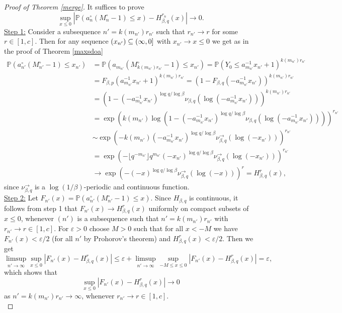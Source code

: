 \documentclass[12pt]{amsart}
\theoremstyle{definition}
\theoremstyle{remark}
\newcommand{\eps}{{\varepsilon}}
\newcommand{\Pm}{{\mathbb P}}
\numberwithin{equation}{section}
\begin{document}
\begin{proof}[Proof of Theorem \ref{merge}]
It suffices to prove
\begin{equation}\label{mergesuff}
\sup_{x\leq0}\left|\Pm\left(a_{n}^{\circ}(M_{n}^{\circ}-1)\leq x\right)-H^{r_{n}}_{\beta,q}(x)\right|\to0.
\end{equation}
\underline{Step 1:} Consider a subsequence $n'=k(m_{n'})r_{n'}$ such that $r_{n'}\to r$ for some $r\in[1,c]$. Then for any sequence $(x_{n'})\subseteq(\-\infty,0]$ with $x_{n'}\to x\leq0$ we get as in the proof of Theorem \ref{maxsdoa}
\begin{align*}
\Pm\left(a_{n'}^{\circ}(M_{n'}^{\circ}-1)\leq x_{n'}\right) & =\Pm\left(a_{m_{n'}}(M_{k(m_{n'})r_{n'}}^{\circ}-1)\leq x_{n'}\right) =\Pm(Y_{0}\leq a_{m_{n'}}^{-1}x_{n'}+1)^{k(m_{n'})r_{n'}}\\
& =F_{\beta,p}(a_{m_{n'}}^{-1}x_{n'}+1)^{k(m_{n'})r_{n'}}=\left(1-F_{\beta,q}(-a_{m_{n'}}^{-1}x_{n'})\right)^{k(m_{n'})r_{n'}}\\
& =\left(1-(-a_{m_{n'}}^{-1}x_{n'})^{\log q/\log\beta}\nu_{\beta,q}(\log(-a_{m_{n'}}^{-1}x_{n'}))\right)^{k(m_{n'})r_{n'}}\\
& =\exp\left(k(m_{n'})\log\left(1-(-a_{m_{n'}}^{-1}x_{n'})^{\log q/\log\beta}\nu_{\beta,q}(\log(-a_{m_{n'}}^{-1}x_{n'}))\right)\right)^{r_{n'}}\\
& \sim\exp\left(-k(m_{n'})(-a_{m_{n'}}^{-1}x_{n'})^{\log q/\log\beta}\nu_{\beta,q}^{\to}(\log(-x_{n'}))\right)^{r_{n'}}\\
& =\exp\left(-\lfloor q^{-m_{n'}}\rfloor q^{m_{n'}}(-x_{n'})^{\log q/\log\beta}\nu_{\beta,q}^{\to}(\log(-x_{n'}))\right)^{r_{n'}}\\
& \to\exp\left(-(-x)^{\log q/\log\beta}\nu_{\beta,q}^{\to}(\log(-x))\right)^{r}=H_{\beta,q}^{r}(x),
\end{align*}
since $\nu_{\beta,q}^{\to}$ is a $\log(1/\beta)$-periodic and continuous function.\\[1ex]

\underline{Step 2:} Let $F_{n'}(x)=\Pm\left(a_{n'}^{\circ}(M_{n'}^{\circ}-1)\leq x\right)$. Since $H_{\beta,q}$ is continuous, it follows from step 1 that $F_{n'}(x)\to H_{\beta,q}^{r}(x)$ uniformly on compact subsets of $x\leq0$, whenever $(n')$ is a subsequence such that $n'=k(m_{n'})r_{n'}$ with $r_{n'}\to r\in[1,c]$. For $\eps>0$ choose $M>0$ such that for all $x<-M$ we have $F_{n'}(x)<\eps/2$ (for all $n'$ by Prohorov's theorem) and $H_{\beta,q}^{r}(x)<\eps/2$. Then we get
$$\limsup_{n'\to\infty}\sup_{x\leq0}\left|F_{n'}(x)-H_{\beta,q}^{r}(x)\right|\leq\eps+\limsup_{n'\to\infty}\sup_{-M\leq x\leq0}\left|F_{n'}(x)-H_{\beta,q}^{r}(x)\right|=\eps,$$
which shows that
\begin{equation}\label{mergesuff1}
\sup_{x\leq0}\left|F_{n'}(x)-H^{r}_{\beta,q}(x)\right|\to0
\end{equation}
as $n'=k(m_{n'})r_{n'}\to\infty$, whenever $r_{n'}\to r\in[1,c]$.\\[1ex]


\end{proof}
\end{document}
